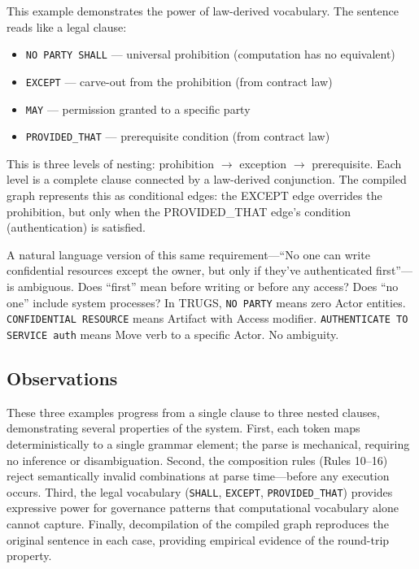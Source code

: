 \documentclass{article}
\begin{document}
This example demonstrates the power of law-derived vocabulary. The sentence reads like a legal clause:

\begin{itemize}
    \item \texttt{NO PARTY SHALL} --- universal prohibition (computation has no equivalent)
    \item \texttt{EXCEPT} --- carve-out from the prohibition (from contract law)
    \item \texttt{MAY} --- permission granted to a specific party
    \item \texttt{PROVIDED\_THAT} --- prerequisite condition (from contract law)
\end{itemize}

This is three levels of nesting: prohibition $\to$ exception $\to$ prerequisite. Each level is a complete clause connected by a law-derived conjunction. The compiled graph represents this as conditional edges: the EXCEPT edge overrides the prohibition, but only when the PROVIDED\_THAT edge's condition (authentication) is satisfied.

A natural language version of this same requirement---``No one can write confidential resources except the owner, but only if they've authenticated first''---is ambiguous. Does ``first'' mean before writing or before any access? Does ``no one'' include system processes? In TRUGS, \texttt{NO PARTY} means zero Actor entities. \texttt{CONFIDENTIAL RESOURCE} means Artifact with Access modifier. \texttt{AUTHENTICATE TO SERVICE auth} means Move verb to a specific Actor. No ambiguity.

\subsection{Observations}

These three examples progress from a single clause to three nested clauses, demonstrating several properties of the system. First, each token maps deterministically to a single grammar element; the parse is mechanical, requiring no inference or disambiguation. Second, the composition rules (Rules 10--16) reject semantically invalid combinations at parse time---before any execution occurs. Third, the legal vocabulary (\texttt{SHALL}, \texttt{EXCEPT}, \texttt{PROVIDED\_THAT}) provides expressive power for governance patterns that computational vocabulary alone cannot capture. Finally, decompilation of the compiled graph reproduces the original sentence in each case, providing empirical evidence of the round-trip property.
\end{document}
